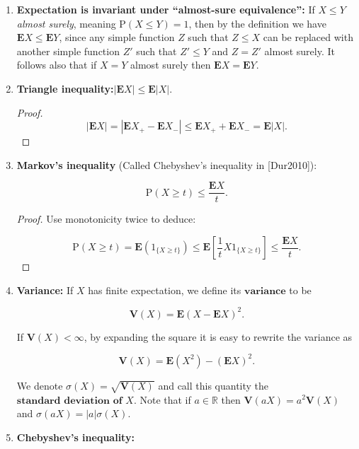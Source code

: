 \documentclass[11pt]{report}
\newcommand{\R}{\mathbb{R}}
\theoremstyle{plain}
\theoremstyle{definition}
\begin{document}
\begin{enumerate}[label=\arabic*.]
\item \textbf{Expectation is invariant under ``almost-sure
equivalence'':} If $X\le Y$\emph{almost surely}, meaning
$\mathrm{P}(X\le Y)=1$, then by the definition we
have $\mathbf{E} X \le \mathbf{E} Y$, since any
simple function $Z$ such that $Z\le X$ can be
replaced with another simple function $Z'$ such that
$Z'\le Y$ and $Z=Z'$ almost surely. It follows also
that if $X=Y$ almost surely then
$\mathbf{E} X=\mathbf{E} Y$.

\item \textbf{Triangle inequality:}$|\mathbf{E} X| \le \mathbf{E} |X|$.

\begin{proof}

\[
|\mathbf{E} X| = |\mathbf{E} X_+ - \mathbf{E} X_- |  \le \mathbf{E} X_+ + \mathbf{E} X_- = \mathbf{E} |X|.
\]

\end{proof}

\item \textbf{Markov's inequality} (Called Chebyshev's inequality
in [Dur2010]):

\[
\mathrm{P}(X \ge t) \le \frac{\mathbf{E} X}{t}.
\]

\begin{proof}
Use monotonicity twice to deduce:

\[
\mathrm{P}(X \ge t) = \mathbf{E}(1_{\{X\ge t\}}) \le \mathbf{E}\left[ \frac{1}{t} X 1_{\{X\ge t\}} \right] \le \frac{\mathbf{E} X}{t}.
\]

\end{proof}

\item \textbf{Variance:} If $X$ has finite expectation, we define
its $\textbf{variance}$ to be

\[
\mathbf{V}(X) = \mathbf{E}(X-\mathbf{E} X)^2.
\]

\noindent If $\mathbf{V}(X)<\infty$, by expanding the square it
is easy to rewrite the variance as

\[
\mathbf{V}(X) = \mathbf{E}(X^2)-(\mathbf{E} X)^2.
\]

\noindent We denote $\sigma(X) = \sqrt{\mathbf{V}(X)}$ and call
this quantity the $\textbf{standard deviation of } X$.
Note that if $a\in \R$ then
$\mathbf{V}(a X) = a^2 \mathbf{V}(X)$ and
$\sigma(a X)=|a| \sigma(X)$.

\item \textbf{Chebyshev's inequality:}


\end{enumerate}
\end{document}
